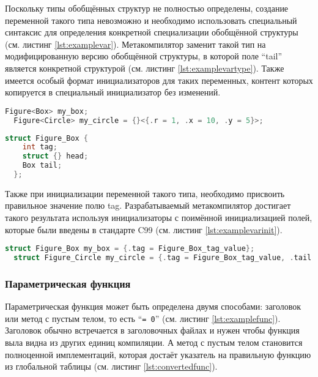 Поскольку типы обобщённых структур не полностью определены, создание переменной такого типа невозможно и необходимо использовать специальный синтаксис для определения конкретной специализации обобщённой структуры (см. листинг \ref{lst:examplevar}).
Метакомпилятор заменит такой тип на модифицированную версию обобщённой структуры, в которой поле ``tail'' является конкретной структурой (см. листинг \ref{lst:examplevartype}).
Также имеется особый формат инициализаторов для таких переменных, контент которых копируется в специальный инициализатор без изменений.

\begin{lstlisting}[language=c, caption={Пример специализации, для определения переменной}, label={lst:examplevar}]
  Figure<Box> my_box;
  Figure<Circle> my_circle = {}<{.r = 1, .x = 10, .y = 5}>;
\end{lstlisting}

\begin{lstlisting}[language=c, caption={Пример специализации, сконвертированный в С}, label={lst:examplevartype}]
  struct Figure_Box {
    int tag;
    struct {} head;
    Box tail;
  };
\end{lstlisting}

Также при инициализации переменной такого типа, необходимо присвоить правильное значение полю tag.
Разрабатываемый метакомпилятор достигает такого результата используя инициализаторы с поимённой инициализацией полей, которые были введены в стандарте C99 (см. листинг \ref{lst:examplevarinit}).

\begin{lstlisting}[language=c, caption={Пример инициализации специализации}, label={lst:examplevarinit}]
  struct Figure_Box my_box = {.tag = Figure_Box_tag_value};
  struct Figure_Circle my_circle = {.tag = Figure_Box_tag_value, .tail = {.r = 1, .x = 10, .y = 5}};
\end{lstlisting}

\subsubsection{Параметрическая функция}

Параметрическая функция может быть определена двумя способами: заголовок или метод с пустым телом, то есть ``\texttt{= 0}'' (см. листинг \ref{lst:examplefunc}).
Заголовок обычно встречается в заголовочных файлах и нужен чтобы функция выла видна из других единиц компиляции.
А метод с пустым телом становится полноценной имплементаций, которая достаёт указатель на правильную функцию из глобальной таблицы (см. листинг \ref{lst:convertedfunc}).

